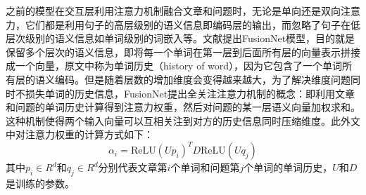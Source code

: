 之前的模型在交互层利用注意力机制融合文章和问题时，无论是单向还是双向注意力，它们都是利用句子的高层级别的语义信息即编码层的输出，而忽略了句子在低层次级别的语义信息如单词级别的词嵌入等。文献\cite{Fusionnet}提出FusionNet模型，目的就是保留多个层次的语义信息，即将每一个单词在第一层到后面所有层的向量表示拼接成一个向量，原文中称为单词历史（history of word），因为它包含了一个单词所有层的语义编码。但是随着层数的增加维度会变得越来越大，为了解决维度问题同时不损失单词的历史信息，FusionNet提出全关注注意力机制的概念：即利用文章和问题的单词历史计算得到注意力权重，然后对问题的某一层语义向量加权求和。这种机制使得两个输入向量可以互相关注到对方的历史信息同时压缩维度。此外文中对注意力权重的计算方式如下：
\begin{equation}
\alpha_i=\text{ReLU}(Up_i)^TD\text{ReLU}(Uq_j)
\end{equation}
其中$p_i\in R^d$和$q_j\in R^d$分别代表文章第$i$个单词和问题第$j$个单词的单词历史，$U$和$D$是训练的参数。



